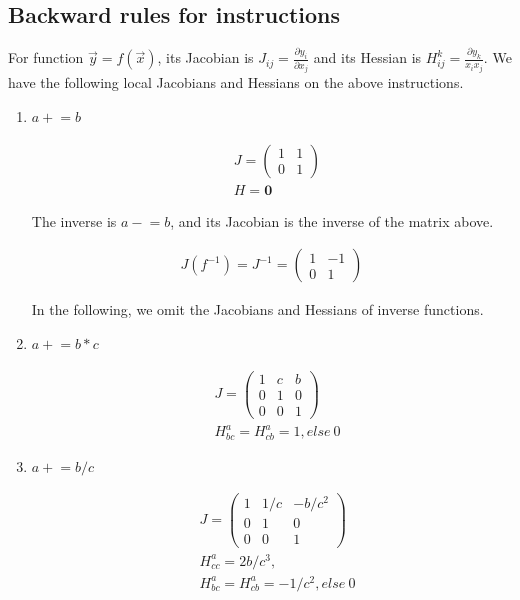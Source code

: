 \documentclass{article}
\newcommand{\<}{\langle}
\renewcommand{\>}{\rangle}
\theoremstyle{definition}\newtheorem{definition}{\textit{Definition}}
\begin{document}
\subsection{Backward rules for instructions}\label{app:jacobians}
For function $\vec{y} = f(\vec{x})$, its Jacobian is $J_{ij} = \frac{\partial y_i}{\partial x_j}$ and its Hessian is $H^k_{ij} = \frac{\partial y_k}{x_i x_j}$.
We have the following local Jacobians and Hessians on the above instructions.

\begin{multicols}{2}
\begin{enumerate}
    \item $a \mathrel+= b$

\begin{align*}
    &J = \left(\begin{matrix}
1 & 1\\
0 & 1
\end{matrix}\right)\\
    &H = \mathbf{0}
\end{align*}

The inverse is $a \mathrel-= b$, and its Jacobian is the inverse of the matrix above.

\begin{align*}
J(f^{-1}) = J^{-1} = \left(\begin{matrix}
1 & -1\\
0 & 1
\end{matrix}\right)
\end{align*}

In the following, we omit the Jacobians and Hessians of inverse functions.

\item $a\mathrel+=b*c$

\begin{align*}
    &J = \left(\begin{matrix}
1 & c & b\\
0 & 1 & 0\\
0 & 0 & 1
\end{matrix}\right)\\
    &H^a_{bc} = H^a_{cb} = 1, else ~0
\end{align*}

\item $a\mathrel+=b/c$

\begin{align*}
    &J = \left(\begin{matrix}
1 & 1/c &-b/c^2\\
0 & 1 & 0\\
0 & 0 & 1
\end{matrix}\right)\\
    &H^a_{cc} = 2b/c^3,\\
    &H^a_{bc} = H^a_{cb} = -1/c^2, else ~ 0
\end{align*}


\end{enumerate}
\end{multicols}
\end{document}
